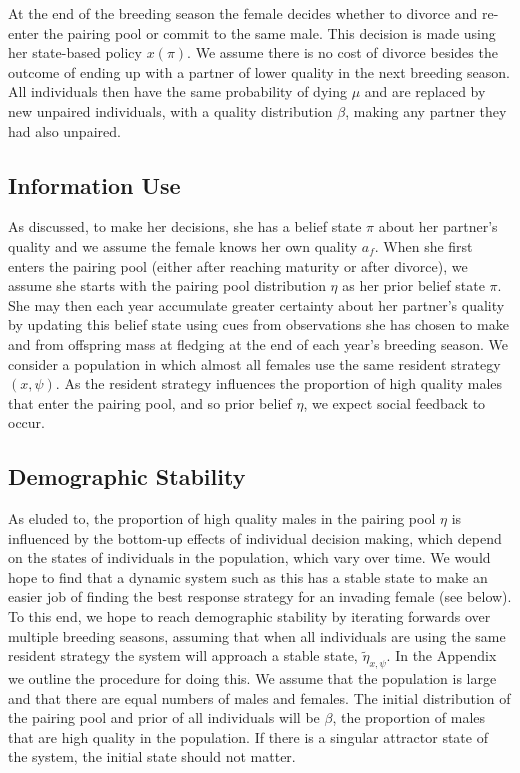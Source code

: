\documentclass[10pt]{article} %
\begin{document}
At the end of the breeding season the female decides whether to divorce and re-enter the pairing pool or commit to the same male. This decision is made using her state-based policy $x(\pi)$. We assume there is no cost of divorce besides the outcome of ending up with a partner of lower quality in the next breeding season. All individuals then have the same probability of dying $\mu$ and are replaced by new unpaired individuals, with a quality distribution $\beta$, making any partner they had also unpaired.

\subsection{Information Use} 
As discussed, to make her decisions, she has a belief state $\pi$ about her partner's quality and we assume the female knows her own quality $a_f$. When she first enters the pairing pool (either after reaching maturity or after divorce), we assume she starts with the pairing pool distribution $\eta$ as her prior belief state $\pi$. She may then each year accumulate greater certainty about her partner's quality by updating this belief state using cues from observations she has chosen to make and from offspring mass at fledging at the end of each year's breeding season. We consider a population in which almost all females use the same resident strategy $(x,\psi)$. As the resident strategy influences the proportion of high quality males that enter the pairing pool, and so prior belief $\eta$, we expect social feedback to occur.

\subsection{Demographic Stability}
As eluded to, the proportion of high quality males in the pairing pool $ \eta $ is influenced by the bottom-up effects of individual decision making, which depend on the states of individuals in the population, which vary over time. We would hope to find that a dynamic system such as this has a stable state to make an easier job of finding the best response strategy for an invading female (see below). To this end, we hope to reach demographic stability by iterating forwards over multiple breeding seasons, assuming that when all individuals are using the same resident strategy the system will approach a stable state, $ \tilde{\eta}_{x,\psi}$. In the Appendix we outline the procedure for doing this. We assume that the population is large and that there are equal numbers of males and females. The initial distribution of the pairing pool and prior of all individuals will be $ \beta $, the proportion of males that are high quality in the population. If there is a singular attractor state of the system, the initial state should not matter. 
\end{document}
